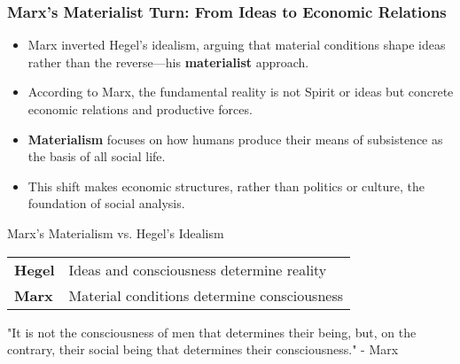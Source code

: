 \documentclass{beamer}
\begin{document}
\begin{frame}
\frametitle{Marx's Materialist Turn: From Ideas to Economic Relations}
\begin{itemize}
    \item Marx inverted Hegel's idealism, arguing that material conditions shape ideas rather than the reverse—his \textbf{materialist} approach.
    \item According to Marx, the fundamental reality is not Spirit or ideas but concrete economic relations and productive forces.
    \item \textbf{Materialism} focuses on how humans produce their means of subsistence as the basis of all social life.
    \item This shift makes economic structures, rather than politics or culture, the foundation of social analysis.
\end{itemize}

\begin{exampleblock}{Marx's Materialism vs. Hegel's Idealism}
\begin{center}
\begin{tabular}{ll}
\textbf{Hegel} & Ideas and consciousness determine reality \\
\textbf{Marx} & Material conditions determine consciousness \\
\end{tabular}
\end{center}
"It is not the consciousness of men that determines their being, but, on the contrary, their social being that determines their consciousness." - Marx
\end{exampleblock}
\end{frame}
\end{document}
